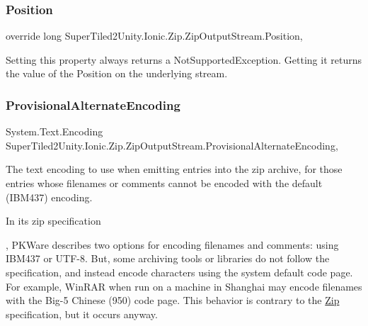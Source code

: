 \subsubsection{\texorpdfstring{Position}{Position}}
{\footnotesize\ttfamily override long Super\+Tiled2\+Unity.\+Ionic.\+Zip.\+Zip\+Output\+Stream.\+Position\hspace{0.3cm}{\ttfamily [get]}, {\ttfamily [set]}}



Setting this property always returns a Not\+Supported\+Exception. Getting it returns the value of the Position on the underlying stream. 

\mbox{\label{class_super_tiled2_unity_1_1_ionic_1_1_zip_1_1_zip_output_stream_aec3ac84c19c3f7c1c7ded0cf4ebba5cf}} 
\subsubsection{\texorpdfstring{Provisional\+Alternate\+Encoding}{ProvisionalAlternateEncoding}}
{\footnotesize\ttfamily System.\+Text.\+Encoding Super\+Tiled2\+Unity.\+Ionic.\+Zip.\+Zip\+Output\+Stream.\+Provisional\+Alternate\+Encoding\hspace{0.3cm}{\ttfamily [get]}, {\ttfamily [set]}}



The text encoding to use when emitting entries into the zip archive, for those entries whose filenames or comments cannot be encoded with the default (I\+B\+M437) encoding. 

In its zip specification

, P\+K\+Ware describes two options for encoding filenames and comments\+: using I\+B\+M437 or U\+T\+F-\/8. But, some archiving tools or libraries do not follow the specification, and instead encode characters using the system default code page. For example, Win\+R\+AR when run on a machine in Shanghai may encode filenames with the Big-\/5 Chinese (950) code page. This behavior is contrary to the \mbox{\hyperlink{namespace_super_tiled2_unity_1_1_ionic_1_1_zip}{Zip}} specification, but it occurs anyway. 

